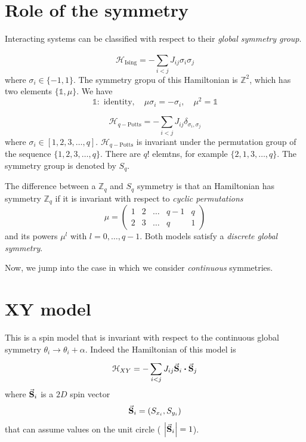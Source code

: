 \documentclass[../main/main.tex]{subfiles}
\begin{document}
\section{Role of the symmetry}
Interacting systems can be classified with respect to their \emph{global symmetry group}.
\begin{example}
  \begin{equation}
    \mathcal{H}_{\text{Ising}} = - \sum_{i<j}^{} J_{ij} \sigma _i \sigma _j
  \end{equation}
  where \( \sigma _i \in \{ -1,1 \}   \). The symmetry gropu of this Hamiltonian is \( \mathbb{Z}^2 \), which has two elements \( \{ \mathbb{1}, \mu  \}   \). We have
  \begin{equation}
    \mathbb{1}: \text{ identity}, \quad \mu \sigma _i = - \sigma _i, \quad \mu ^2 = \mathbb{1}
  \end{equation}
\end{example}
\begin{example}
  \begin{equation}
    \mathcal{H}_{q- \text{Potts}} = - \sum_{i<j}^{} J_{ij} \delta _{\sigma _i, \sigma _j}
  \end{equation}
  where \( \sigma _i \in [1,2,3,\dots,q] \). \( \mathcal{H}_{q- \text{Potts}} \)  is invariant under the permutation group of the sequence \( \{ 1,2,3,\dots,q \}   \). There are \( q! \) elemtns, for example \( \{ 2,1,3,\dots,q \}   \). The symmetry group is denoted by \( S_q \).
\end{example}
\begin{remark}
The difference between a \( \mathbb{Z}_q \) and \( S_q \) symmetry is that an Hamiltonian has symmetry \( \mathbb{Z}_q \) if it is invariant with respect to \emph{cyclic permutations}
\begin{equation}
  \mu = \begin{pmatrix}
    1 & 2 & \dots & q-1 & q \\
    2 & 3 & \dots & q & 1
  \end{pmatrix}
\end{equation}
and its powers \( \mu ^l \) with \( l=0, \dots, q-1 \). Both models satisfy a \emph{discrete global symmetry}.
\end{remark}
Now, we jump into the case in which we consider \emph{continuous} symmetries.

\section{XY model}
This is a spin model that is invariant with respect to the continuous global symmetry
\( \theta _i \rightarrow \theta _i + \alpha  \).
Indeed the Hamiltonian of this model is
\begin{equation}
  \mathcal{H}_{XY} = - \sum_{i<j}^{} J_{ij} \va{S}_i \vdot \va{S}_j
\end{equation}
where \(\va{S}_i  \) is a \( 2D \) spin vector
\begin{equation}
  \va{S}_i = (S_{x_i}, S_{y_i})
\end{equation}
that can assume values on the unit circle ( \(  \abs{\va{S}_i} =1 \)).
\end{document}
